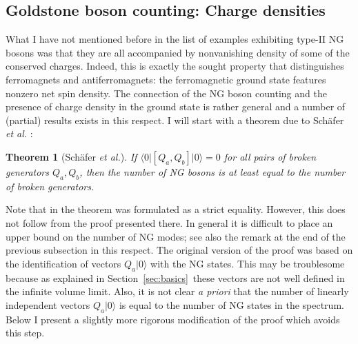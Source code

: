 \documentclass[final,2p,times,12pt,sort&compress]{elsarticle}
\newcommand\bra[1]{\langle#1\vert}          %
\newcommand\ket[1]{\vert#1\rangle}          %
\newcommand\thname{Theorem}
\newtheorem{theorem}{\thname}
\begin{document}
\subsection{Goldstone boson counting: Charge densities}
\label{subsec:charge_densities}
What I have not mentioned before in the list of examples exhibiting type-II NG
bosons was that they are all accompanied by nonvanishing density of some of the
conserved charges. Indeed, this is exactly the sought property that
distinguishes ferromagnets and antiferromagnets: the ferromagnetic ground state
features nonzero net spin density. The connection of the NG boson counting and
the presence of charge density in the ground state is rather general and a
number of (partial) results exists in this respect. I will start with a theorem
due to Sch\"afer \emph{et al.} \cite{Schafer:2001bq}:
\begin{theorem}[Sch\"afer \emph{et al.}]
\label{thm:schafer}
If $\bra0[Q_a,Q_b]\ket0=0$ for all pairs of broken generators $Q_a,Q_b$, then
the number of NG bosons is at least equal to the number of broken generators.
\end{theorem}
Note that in \cite{Schafer:2001bq} the theorem was formulated as a strict
equality. However, this does not follow from the proof presented there. In
general it is difficult to place an upper bound on the number of NG modes; see
also the remark at the end of the previous subsection in this respect. The
original version of the proof was based on the identification of vectors
$Q_a\ket0$ with the NG states. This may be troublesome because as explained in
Section~\ref{sec:basics}\ these vectors are not well defined in the infinite
volume limit. Also, it is not clear \emph{a priori} that the number of linearly
independent vectors $Q_a\ket0$ is equal to the number of NG states in the
spectrum. Below I present a slightly more rigorous modification of the proof
which avoids this step.
\end{document}
